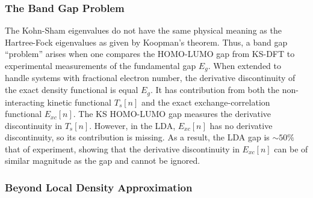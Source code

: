 \subsubsection{The Band Gap Problem}
The Kohn-Sham eigenvalues do not have the same physical meaning as the Hartree-Fock eigenvalues as given by Koopman's theorem. Thus, a band gap ``problem'' arises when one compares the HOMO-LUMO gap from KS-DFT to experimental measurements of the fundamental gap $E_g$. When extended to handle systems with fractional electron number, the derivative discontinuity of the exact density functional is equal $E_g$. It has contribution from both the non-interacting kinetic functional $T_s[n]$ and the exact exchange-correlation functional $E_{xc}[n]$. The KS HOMO-LUMO gap measures the derivative discontinuity in $T_s[n]$. However, in the LDA, $E_{xc}[n]$ has no derivative discontinuity, so its contribution is missing. As a result, the LDA gap is $\sim 50\%$ that of experiment, showing that the derivative discontinuity in $E_{xc}[n]$ can be of similar magnitude as the gap and cannot be ignored.


\subsubsection{Beyond Local Density Approximation}
